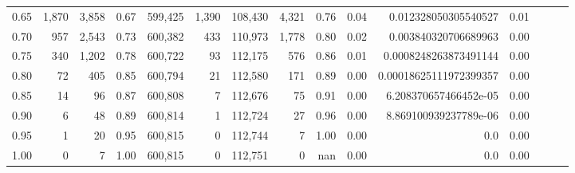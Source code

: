 \begin{tabular}{rrrrrrrrrrrrrrr}
0.65 &    1,870 &   3,858 &  0.67 &  599,425 &    1,390 &  108,430 &    4,321 &  0.76 &  0.04 &    0.012328050305540527 &      0.01 \\
0.70 &      957 &   2,543 &  0.73 &  600,382 &      433 &  110,973 &    1,778 &  0.80 &  0.02 &    0.003840320706689963 &      0.00 \\
0.75 &      340 &   1,202 &  0.78 &  600,722 &       93 &  112,175 &      576 &  0.86 &  0.01 &   0.0008248263873491144 &      0.00 \\
0.80 &       72 &     405 &  0.85 &  600,794 &       21 &  112,580 &      171 &  0.89 &  0.00 &  0.00018625111972399357 &      0.00 \\
0.85 &       14 &      96 &  0.87 &  600,808 &        7 &  112,676 &       75 &  0.91 &  0.00 &   6.208370657466452e-05 &      0.00 \\
0.90 &        6 &      48 &  0.89 &  600,814 &        1 &  112,724 &       27 &  0.96 &  0.00 &   8.869100939237789e-06 &      0.00 \\
0.95 &        1 &      20 &  0.95 &  600,815 &        0 &  112,744 &        7 &  1.00 &  0.00 &                     0.0 &      0.00 \\
1.00 &        0 &       7 &  1.00 &  600,815 &        0 &  112,751 &        0 &   nan &  0.00 &                     0.0 &      0.00 \\
\bottomrule
\end{tabular}
